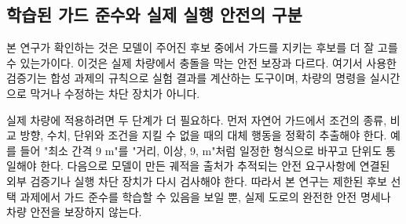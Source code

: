 \subsection{학습된 가드 준수와 실제 실행 안전의 구분}

본 연구가 확인하는 것은 모델이 주어진 후보 중에서 가드를 지키는 후보를 더 잘 고를 수 있는가이다. 이것은 실제 차량에서 충돌을 막는 안전 보장과 다르다. 여기서 사용한 검증기는 합성 과제의 규칙으로 실험 결과를 계산하는 도구이며, 차량의 명령을 실시간으로 막거나 수정하는 차단 장치가 아니다.


실제 차량에 적용하려면 두 단계가 더 필요하다. 먼저 자연어 가드에서 조건의 종류, 비교 방향, 수치, 단위와 조건을 지킬 수 없을 때의 대체 행동을 정확히 추출해야 한다. 예를 들어 "최소 간격 9 m"를 "거리, 이상, 9, m"처럼 일정한 형식으로 바꾸고 단위도 통일해야 한다. 다음으로 모델이 만든 궤적을 출처가 추적되는 안전 요구사항에 연결된 외부 검증기나 실행 차단 장치가 다시 검사해야 한다. 따라서 본 연구는 제한된 후보 선택 과제에서 가드 준수를 학습할 수 있음을 보일 뿐, 실제 도로의 완전한 안전 명세나 차량 안전을 보장하지 않는다.
